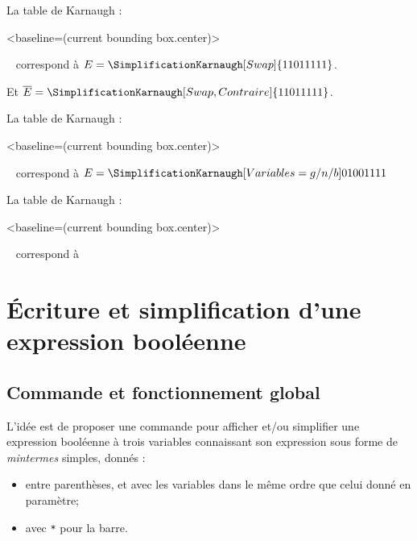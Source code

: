 \documentclass[french,a4paper,11pt]{article}
\begin{document}
{{\begin{DemoCode}
La table de Karnaugh :
\begin{TableKarnaugh}[Swap]<baseline=(current bounding box.center)>
\end{TableKarnaugh}~
correspond à $E=\SimplificationKarnaugh[Swap]{11011111}$.

Et $\overline{E}=\SimplificationKarnaugh[Swap,Contraire]{11011111}$.
\end{DemoCode}

\begin{DemoCode}
La table de Karnaugh :
\begin{TableKarnaugh}[Variables={g/n/b}]<baseline=(current bounding box.center)>
\end{TableKarnaugh}~
correspond à $E=\SimplificationKarnaugh[Variables={g/n/b}]{01001111}$
\end{DemoCode}

\begin{DemoCode}
La table de Karnaugh :
\begin{TableKarnaugh}[StyleAlternatif]<baseline=(current bounding box.center)>
\end{TableKarnaugh}~
correspond à 
\end{DemoCode}

\pagebreak

\section{Écriture et simplification d'une expression booléenne}

\subsection{Commande et fonctionnement global}

\begin{cautionblock}
L'idée est de proposer une commande pour afficher et/ou simplifier une expression booléenne à trois variables connaissant son expression sous forme de \textit{mintermes} simples, donnés : 
%
\begin{itemize}
	\item entre parenthèses, et avec les variables dans le même ordre que celui donné en paramètre;
	\item avec \texttt{*} pour la barre.
\end{itemize}


\end{cautionblock}}}
\end{document}
